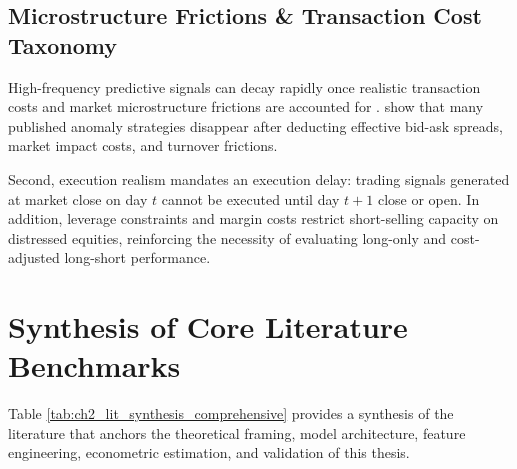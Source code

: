 \subsection{Microstructure Frictions \& Transaction Cost Taxonomy}
High-frequency predictive signals can decay rapidly once realistic transaction costs and market microstructure frictions are accounted for \citep{novy2016taxonomy, frazzini2014betting}. \citet{novy2016taxonomy} show that many published anomaly strategies disappear after deducting effective bid-ask spreads, market impact costs, and turnover frictions.

Second, execution realism mandates an execution delay: trading signals generated at market close on day $t$ cannot be executed until day $t+1$ close or open. In addition, leverage constraints and margin costs \citep{frazzini2014betting} restrict short-selling capacity on distressed equities, reinforcing the necessity of evaluating long-only and cost-adjusted long-short performance.

\section{Synthesis of Core Literature Benchmarks}
Table \ref{tab:ch2_lit_synthesis_comprehensive} provides a synthesis of the literature that anchors the theoretical framing, model architecture, feature engineering, econometric estimation, and validation of this thesis.

